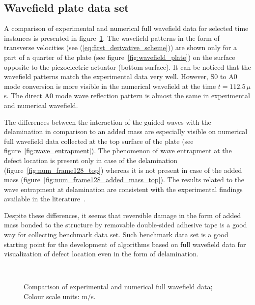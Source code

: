 \documentclass[12pt]{iopart}
\begin{document}
\subsection{Wavefield plate data set }
A comparison of experimental and numerical full wavefield data for selected time instances is presented in figure~\ref{fig:wavefields_comparison}. The wavefield patterns in the form of transverse velocities (see (\ref{eq:first_derivative_scheme})) are shown only for a part of a quarter of the plate (see figure~\ref{fig:wavefield_plate}) on the surface opposite to the piezoelectric actuator (bottom surface). It can be noticed that the wavefield patterns match the experimental data very well. However, S0 to A0 mode conversion is more visible in the numerical wavefield at the time \(t=112.5\,  \mu\)s. The direct A0 mode wave reflection pattern is almost the same in experimental and numerical wavefield.

The differences between the interaction of the guided waves with the delamination in comparison to an added mass are especially visible on numerical full wavefield data collected at the top surface of the plate (see figure~\ref{fig:wave_entrapment}). The phenomenon of wave entrapment at the defect location is present only in case of the delamination (figure~\ref{fig:num_frame128_top}) whereas it is not present in case of the added mass (figure~\ref{fig:num_frame128_added_mass_top}). The results related to the wave entrapment at delamination are consistent with the experimental findings available in the literature~\cite{Glushkov2012}. 

Despite these differences, it seems that reversible damage in the form of added mass bonded to the structure by removable double-sided adhesive tape is a good way for collecting benchmark data set. Such benchmark data set is a good starting point for the development of algorithms based on full wavefield data for visualization of defect location even in the form of delamination.

\begin{figure} [h!]
	\centering
   \hspace{0.5 cm} 	
   \\	
   \hspace{0.5 cm} 	
	\caption{Comparison of experimental and numerical full wavefield data; Colour scale units: m/s.} 
	\label{fig:wavefields_comparison}
\end{figure}
\end{document}
